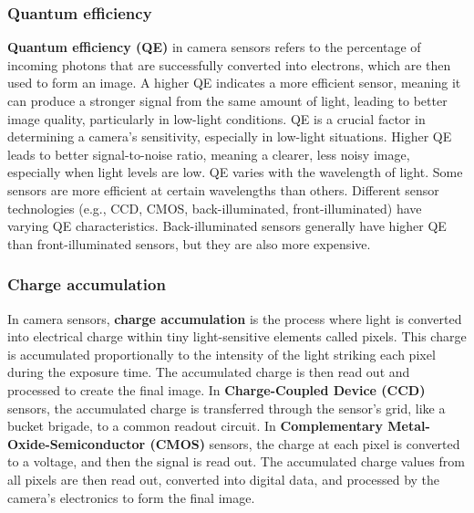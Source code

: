 \documentclass[10pt]{article}
\begin{document}
\begin{multicols}{2}
\subsubsection{Quantum efficiency}
\textbf{Quantum efficiency (QE)} in camera sensors refers to the percentage of incoming photons that are successfully converted into electrons, which are then used to form an image. A higher QE indicates a more efficient sensor, meaning it can produce a stronger signal from the same amount of light, leading to better image quality, particularly in low-light conditions. 
\newline \newline
QE is a crucial factor in determining a camera's sensitivity, especially in low-light situations. Higher QE leads to better signal-to-noise ratio, meaning a clearer, less noisy image, especially when light levels are low.
QE varies with the wavelength of light. Some sensors are more efficient at certain wavelengths than others. Different sensor technologies (e.g., CCD, CMOS, back-illuminated, front-illuminated) have varying QE characteristics. Back-illuminated sensors generally have higher QE than front-illuminated sensors, but they are also more expensive. 

\subsubsection{Charge accumulation}
In camera sensors, \textbf{charge accumulation} is the process where light is converted into electrical charge within tiny light-sensitive elements called pixels. This charge is accumulated proportionally to the intensity of the light striking each pixel during the exposure time. The accumulated charge is then read out and processed to create the final image. 
\newline \newline
In \textbf{Charge-Coupled Device (CCD)} sensors, the accumulated charge is transferred through the sensor's grid, like a bucket brigade, to a common readout circuit. 
In \textbf{Complementary Metal-Oxide-Semiconductor (CMOS)} sensors, the charge at each pixel is converted to a voltage, and then the signal is read out. 
The accumulated charge values from all pixels are then read out, converted into digital data, and processed by the camera's electronics to form the final image. 


\end{multicols}
\end{document}
